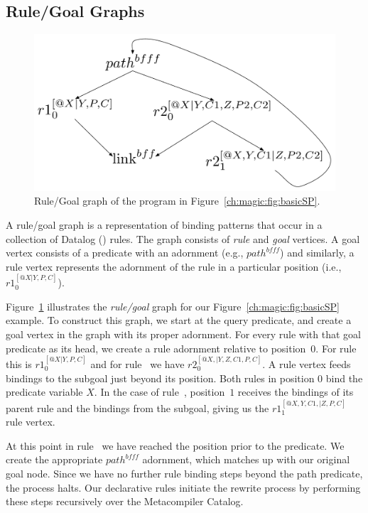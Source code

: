 \subsection{Rule/Goal Graphs}

\begin{figure}[!t]
\begin{center}
\includegraphics[scale=0.5]{figures/RuleGoalGraph}
\caption{\label{ch:magic:fig:rggraph}Rule/Goal graph of the program in Figure~\ref{ch:magic:fig:basicSP}.}
\end{center}
\end{figure}

A rule/goal graph is a representation of binding patterns that occur in a
collection of Datalog (\OVERLOG) rules.  The graph consists of {\em rule} and
{\em goal} vertices.  A goal vertex consists of a predicate with an adornment
(e.g., $path^{bfff}$) and similarly, a rule vertex represents the adornment of
the rule in a particular position (i.e., $r1_0^{[@X|Y,P,C]}$).

Figure~\ref{ch:magic:fig:rggraph} illustrates the {\em rule/goal} graph for our
Figure~\ref{ch:magic:fig:basicSP} example.  To construct this graph, we start
at the query predicate, and create a goal vertex in the graph with its proper
adornment.  For every rule with that goal predicate as its head, we create a
rule adornment relative to position~$0$.  For rule~ this is
$r1_0^{[@X|Y,P,C]}$ and for rule~ we have $r2_0^{[@X,|Y,Z,C1,P,C]}$.  A
rule vertex feeds bindings to the subgoal just beyond its position.  Both rules
in position $0$ bind the  predicate variable $X$.  In the case of
rule~, position~$1$ receives the bindings of its parent rule and
the bindings from the  subgoal, giving us the
$r1_1^{[@X,Y,C1,|Z,P,C]}$ rule vertex.

At this point in rule~ we have reached the position prior to the
 predicate.  We create the appropriate $path^{bfff}$ adornment, which
matches up with our original  goal node.  Since we have no further
rule binding steps beyond the path predicate, the process halts.  Our
declarative rules initiate the rewrite process by performing these steps
recursively over the Metacompiler Catalog.

